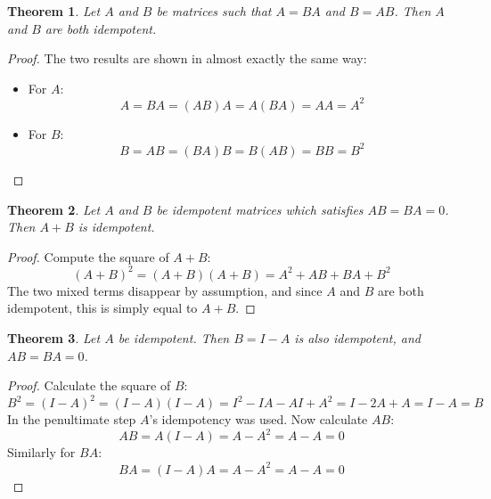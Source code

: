 \documentclass[12pt, a4paper]{article}
\newtheorem{theorem}{Theorem}
\begin{document}
\begin{theorem}
Let $A$ and $B$ be matrices such that $A=BA$ and $B=AB$. Then $A$ and $B$ are both idempotent.
\end{theorem}
\begin{proof}
The two results are shown in almost exactly the same way:
\begin{itemize}
\item For $A$:
\begin{equation}
A=BA=(AB)A=A(BA)=AA=A^2
\end{equation}
\item For $B$:
\begin{equation}
B=AB=(BA)B=B(AB)=BB=B^2
\end{equation}
\end{itemize}
\end{proof}

\begin{theorem}
Let $A$ and $B$ be idempotent matrices which satisfies $AB=BA=0$. Then $A+B$ is idempotent.
\end{theorem}
\begin{proof}
Compute the square of $A+B$:
\begin{equation}
(A+B)^2=(A+B)(A+B)=A^2+AB+BA+B^2
\end{equation}
The two mixed terms disappear by assumption, and since $A$ and $B$ are both idempotent, this is simply equal to $A+B$.
\end{proof}

\begin{theorem}
Let $A$ be idempotent. Then $B=I-A$ is also idempotent, and $AB=BA=0$.
\end{theorem}
\begin{proof}
Calculate the square of $B$:
\begin{equation}
B^2=(I-A)^2=(I-A)(I-A)=I^2-IA-AI+A^2=I-2A+A=I-A=B
\end{equation}
In the penultimate step $A$'s idempotency was used. Now calculate $AB$:
\begin{equation}
AB=A(I-A)=A-A^2=A-A=0
\end{equation}
Similarly for $BA$:
\begin{equation}
BA=(I-A)A=A-A^2=A-A=0
\end{equation}
\end{proof}
\end{document}
